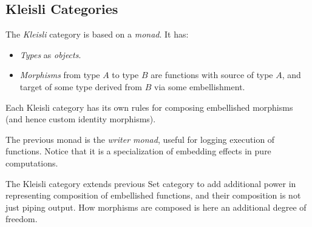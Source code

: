 \subsection{Kleisli Categories}

\begin{definition}
    The \textit{Kleisli} category is based on a \textit{monad}. It has:
    \begin{itemize}
        \item \textit{Types} as \textit{objects}.
        \item \textit{Morphisms} from type $A$ to type $B$ are functions with source of type $A$, and target of some type derived from $B$ via some embellishment.
    \end{itemize}
    
    Each Kleisli category has its own rules for composing embellished morphisms (and hence custom identity morphisms).
\end{definition}

\begin{remark}
    The previous monad is the \textit{writer monad}, useful for logging execution of functions. Notice that it is a specialization of embedding effects in pure computations.
    
    The Kleisli category extends previous Set category to add additional power in representing composition of embellished functions, and their composition is not just piping output. How morphisms are composed is here an additional degree of freedom.
\end{remark}
